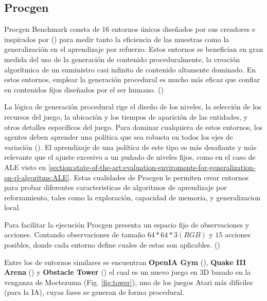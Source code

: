 \subsection{Procgen}

Procgen Benchmark consta de 16 entornos únicos diseñados por sus creadores e inspirados por (\cite{bellemare2013arcade}) para medir tanto la eficiencia de las muestras como la generalización en el aprendizaje por refuerzo. Estos entornos se benefician en gran medida del uso de la generación de contenido proceduralmente, la creación algorítmica de un suministro casi infinito de contenido altamente dominado. En estos entornos, emplear la generación procedural es mucho más eficaz que confiar en contenidos fijos diseñados por el ser humano. (\cite{cobbe2020leveraging})

La lógica de generación procedural rige el diseño de los niveles, la selección de los recursos del juego, la ubicación y los tiempos de aparición de las entidades, y otros detalles específicos del juego. Para dominar cualquiera de estos entornos, los agentes deben aprender una política que sea robusta en todos los ejes de variación (\cite{cobbe2020leveraging}). El aprendizaje de una política de este tipo es más desafiante y más relevante que el ajuste excesivo a un puñado de niveles fijos, como en el caso de ALE visto en \ref{section:state-of-the-art:evaluation-enviroments-for-generalization-on-rl-algoritms:ALE}. Estas cualidades de Procgen le permiten crear entornos para probar diferentes caracteristicas de algoritmos de aprendizaje por reforzamiento, tales como la exploración, capacidad de memoria, y generalizacion local.

Para facilitar la ejecución Procgen presenta un espacio fijo de observaciones y acciones. Contando observaciones de tamaño $64*64*3(RGB)$ y $15$ acciones posibles, donde cada entorno define cuales de estas son aplicables. (\cite{cobbe2020leveraging})

Entre los de entornos similares se encuentran \textbf{OpenIA Gym} (\cite{brockman2016openai}), \textbf{Quake III Arena} (\cite{jaderberg2019human}) y \textbf{Obstacle Tower} (\cite{juliani2019obstacle}) el cual es un nuevo juego en 3D basado en la venganza de Moctezuma (Fig. \ref{fig:tower}), uno de los juegos Atari más difíciles (para la IA), cuyas fases se generan de forma procedural.


